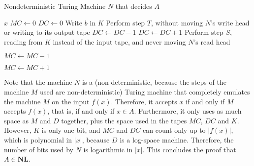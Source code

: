 \documentclass{amsart}
\theoremstyle{plain}
\theoremstyle{definition}
\newcommand{\nl}{\textbf{NL}}
\begin{document}
\begin{enumerate}[label=\textbf{Exercise \arabic*:}, leftmargin=0cm, labelwidth=-0.2cm, align=left]
            \begin{algorithm}[H]
            \caption{Nondeterministic Turing Machine $N$ that decides $A$}
            \label{alg:kpartite}
            \begin{algorithmic}[1]
                \Require $x$
                \State $MC \gets 0$
                        \State $DC \gets 0$
                                \State Write $b$ in $K$
                            \EndIf
                            \State Perform step $T$, without moving $N$'s write head or writing to its output tape
                                \State $DC \gets DC - 1$
                                \State $DC \gets DC + 1$
                            \EndIf
                        \EndFor
                    \EndIf
                    \State Perform step $S$, reading from $K$ instead of the input tape, and never moving $N$'s read head

                        \State $MC \gets MC - 1$

                        \State $MC \gets MC + 1$

                    \EndIf
                \EndFor
                
                    \end{algorithmic}
        \end{algorithm}

    \end{enumerate}

    Note that the machine $N$ is a (non-deterministic, because the steps of the machine
    $M$ used are non-deterministic) Turing machine that completely emulates the machine $M$
    on the input $f(x)$.
    Therefore, it accepts $x$ if and only if $M$ accepts $f(x)$, that is, if and only if $x \in A$.
    Furthermore, it only uses as much space as $M$ and $D$ together, plus
    the space used in the tapes $MC$, $DC$ and $K$.
    However, $K$ is only one bit, and $MC$ and $DC$ can count only up to $|f(x)|$, which is polynomial in $|x|$,
    because $D$ is a log-space machine.
    Therefore, the number of bits used by $N$ is logarithmic in $|x|$.
    This concludes the proof that $A \in \nl$.
\end{document}
